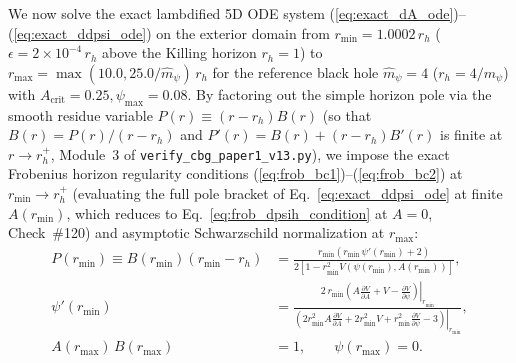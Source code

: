 \documentclass[11pt,a4paper]{article}
\theoremstyle{definition}
\theoremstyle{remark}
\begin{document}
We now solve the exact lambdified 5D ODE system (\ref{eq:exact_dA_ode})--(\ref{eq:exact_ddpsi_ode}) on the exterior domain from $r_{\min} = 1.0002\,r_h$ ($\epsilon = 2 \times 10^{-4}\,r_h$ above the Killing horizon $r_h = 1$) to $r_{\max} = \max(10.0, 25.0/\hat{m}_{\psi})\,r_h$ for the reference black hole $\hat{m}_{\psi} = 4$ ($r_h = 4/m_{\psi}$) with $A_{\text{crit}} = 0.25, \psi_{\max} = 0.08$. By factoring out the simple horizon pole via the smooth residue variable $P(r) \equiv (r - r_h)B(r)$ (so that $B(r) = P(r)/(r - r_h)$ and $P'(r) = B(r) + (r - r_h)B'(r)$ is finite at $r \to r_h^+$, Module~3 of \texttt{verify\_cbg\_paper1\_v13.py}), we impose the exact Frobenius horizon regularity conditions (\ref{eq:frob_bc1})--(\ref{eq:frob_bc2}) at $r_{\min} \to r_h^+$ (evaluating the full pole bracket of Eq.~\ref{eq:exact_ddpsi_ode} at finite $A(r_{\min})$, which reduces to Eq.~\ref{eq:frob_dpsih_condition} at $A = 0$, Check~\#120) and asymptotic Schwarzschild normalization at $r_{\max}$:
\begin{align}
  P(r_{\min}) \equiv B(r_{\min})\left(r_{\min} - r_h\right) &= \frac{r_{\min}\left(r_{\min}\,\psi'(r_{\min}) + 2\right)}{2\left[1 - r_{\min}^2 V(\psi(r_{\min}), A(r_{\min}))\right]}, \label{eq:frob_bc1} \\[4pt]
  \psi'(r_{\min}) &= \frac{2\,r_{\min}\left.\left(A\frac{\partial V}{\partial A} + V - \frac{\partial V}{\partial\psi}\right)\right|_{r_{\min}}}{\left.\left(2 r_{\min}^2 A\frac{\partial V}{\partial A} + 2 r_{\min}^2 V + r_{\min}^2\frac{\partial V}{\partial\psi} - 3\right)\right|_{r_{\min}}}, \label{eq:frob_bc2} \\[4pt]
  A(r_{\max})\,B(r_{\max}) &= 1, \qquad \psi(r_{\max}) = 0. \label{eq:frob_bc3}
\end{align}
\end{document}
